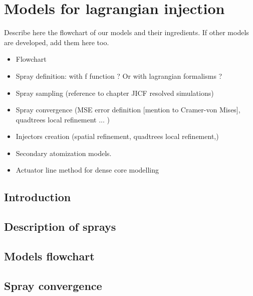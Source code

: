 \chapter{Models for lagrangian injection}
	\label{ch:sli_development}


Describe here the flowchart of our models and their ingredients. 
If other models are developed, add them here too.

\begin{itemize}

	\item Flowchart
	
	\item Spray definition: with f function ? Or with lagrangian formalisms ?
	
	\item Spray sampling (reference to chapter JICF resolved simulations)	
	
	\item Spray convergence (MSE error definition [mention to Cramer-von Mises], quadtrees local refinement ... )
	
	\item Injectors creation (spatial refinement, quadtrees local refinement,)

	\item Secondary atomization models.
	
	\item Actuator line method for dense core modelling

\end{itemize}

\section{Introduction}

\section{Description of sprays}

\section{Models flowchart}

\section{Spray convergence}


